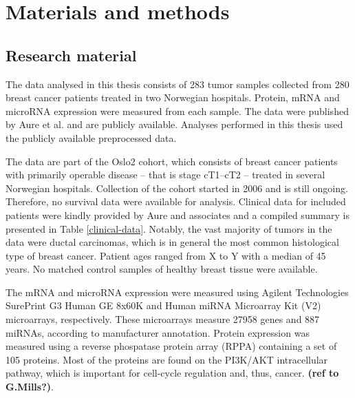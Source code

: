 

\section{Materials and methods}\label{materials-and-methods}

\subsection{Research material}

The data analysed in this thesis consists of 283 tumor samples collected from
280 breast cancer patients treated in two Norwegian hospitals. Protein, mRNA
and microRNA expression were measured from each sample. The data were
published by Aure et al. \citep{Aure2015} and are publicly available. Analyses
performed in this thesis used the publicly available preprocessed data.

The data are part of the Oslo2 cohort, which consists of breast cancer
patients with primarily operable disease -- that is stage cT1--cT2 -- treated
in several Norwegian hospitals. Collection of the cohort started in 2006 and
is still ongoing. Therefore, no survival data were available for analysis.
Clinical data for included patients were kindly provided by Aure and
associates and a compiled summary is presented in Table
\ref{clinical-data}. Notably, the vast majority of tumors in the data
were ductal carcinomas, which is in general the most common histological type
of breast cancer. Patient ages ranged from X to Y with a median of 45 years.
No matched control samples of healthy breast tissue were available.



The mRNA and microRNA expression were measured using Agilent Technologies
SurePrint G3 Human GE 8x60K and Human miRNA Microarray Kit (V2) microarrays,
respectively. These microarrays measure 27958 genes and 887 miRNAs, according
to manufacturer annotation. Protein expression was measured using a reverse
phospatase protein array (RPPA) containing a set of 105 proteins. Most of the
proteins are found on the PI3K/AKT intracellular pathway, which is important
for cell-cycle regulation and, thus, cancer. \textbf{(ref to G.Mills?)}.



